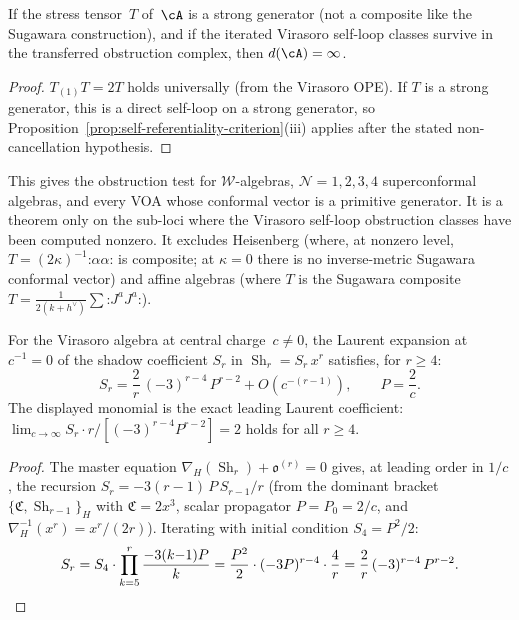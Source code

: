\begin{corollary}
\label{cor:conformal-vector-infinite-depth}
\ClaimStatusProvedHere
If the stress tensor~$T$ of~$\cA$ is a strong generator
\textup{(}not a composite like the Sugawara construction\textup{)}, and
if the iterated Virasoro self-loop classes survive in the transferred
obstruction complex,
then $d(\cA) = \infty$.
\end{corollary}

\begin{proof}
$T_{(1)}T = 2T$ holds universally (from the Virasoro OPE).
If $T$ is a strong generator, this is a direct self-loop on a
strong generator, so
Proposition~\ref{prop:self-referentiality-criterion}(iii) applies
after the stated non-cancellation hypothesis.
\end{proof}

This gives the obstruction test for $\mathcal{W}$-algebras,
$\mathcal{N} = 1, 2, 3, 4$ superconformal algebras, and every VOA whose
conformal vector is a primitive generator. It is a theorem only on the
sub-loci where the Virasoro self-loop obstruction classes have been
computed nonzero. It excludes Heisenberg
(where, at nonzero level, $T=(2\kappa)^{-1}
\mathord{:}\alpha\alpha\mathord{:}$ is composite; at $\kappa=0$
there is no inverse-metric Sugawara conformal vector) and affine
algebras (where $T$ is the Sugawara
composite $T = \tfrac{1}{2(k+h^\vee)}\sum\mathord{:}J^a J^a
\mathord{:}$).

\begin{theorem}
\label{thm:shadow-tower-asymptotics}
\ClaimStatusProvedHere
For the Virasoro algebra at central charge~$c\neq0$, the Laurent
expansion at $c^{-1}=0$ of the shadow coefficient
$S_r$ in $\operatorname{Sh}_r = S_r\,x^r$ satisfies, for $r \geq 4$:
\begin{equation}\label{eq:shadow-leading}
 S_r = \frac{2}{r}\,(-3)^{r-4}\,P^{r-2}
 + O(c^{-(r-1)}),
 \qquad P = \frac{2}{c}.
\end{equation}
The displayed monomial is the exact leading Laurent coefficient:
$\lim_{c\to\infty} S_r \cdot r / [(-3)^{r-4} P^{r-2}] = 2$
holds for all $r \geq 4$.
\end{theorem}

\begin{proof}
The master equation $\nabla_H(\operatorname{Sh}_r) + \mathfrak{o}^{(r)} = 0$
gives, at leading order in $1/c$, the recursion
$S_r = -3(r{-}1)\,P\,S_{r-1}/r$
(from the dominant bracket
$\{\mathfrak{C}, \operatorname{Sh}_{r-1}\}_H$ with
$\mathfrak{C} = 2x^3$, scalar propagator $P=P_0=2/c$, and
$\nabla_H^{-1}(x^r) = x^r/(2r)$). Iterating with initial condition
$S_4 = P^2/2$:
\[
 S_r = S_4 \cdot \prod_{k=5}^{r} \frac{-3(k{-}1)P}{k}
 = \frac{P^2}{2} \cdot (-3P)^{r-4} \cdot \frac{4}{r}
 = \frac{2}{r}\,(-3)^{r-4}\,P^{r-2}.\qedhere
\]
\end{proof}

